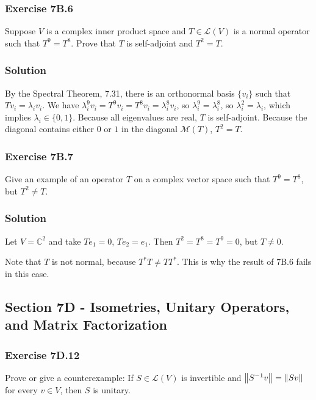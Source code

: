 \subsubsection*{Exercise 7B.6}

Suppose $V$ is a complex inner product space and $T \in \mathcal{L}(V)$ is a normal operator such that $T^9 = T^8$.
Prove that $T$ is self-adjoint and $T^2 = T$.

\subsubsection*{Solution}

By the Spectral Theorem, 7.31, there is an orthonormal basis $\{v_i\}$ such that $Tv_i = \lambda_i v_i$.
We have $\lambda_i^9 v_i = T^9 v_i = T^8 v_i = \lambda_i^8 v_i$, so $\lambda_i^9 = \lambda_i^8$, so $\lambda_i^2 = \lambda_i$, which implies $\lambda_i \in \{0, 1\}$.
Because all eigenvalues are real, $T$ is self-adjoint.
Because the diagonal contains either $0$ or $1$ in the diagonal $\mathcal{M}(T)$, $T^2 = T$.


\subsubsection*{Exercise 7B.7}

Give an example of an operator $T$ on a complex vector space such that $T^9 = T^8$, but $T^2 \neq T$.

\subsubsection*{Solution}

Let $V = \mathbb{C}^2$ and take $Te_1 = 0$, $Te_2 = e_1$.
Then $T^2 = T^8 = T^9 = 0$, but $T \neq 0$.

Note that $T$ is not normal, because $T^*T \neq TT^*$.
This is why the result of 7B.6 fails in this case.


\subsection*{Section 7D - Isometries, Unitary Operators, and Matrix Factorization}

\subsubsection*{Exercise 7D.12}

Prove or give a counterexample: If $S \in \mathcal{L}(V)$ is invertible and $\left\lVert S^{-1}v\right\rVert = \left\lVert Sv\right\rVert$ for every $v \in V$, then $S$ is unitary.

